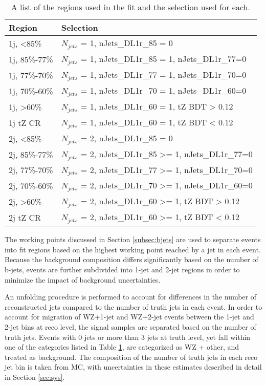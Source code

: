 \begin{table}[H] 
\centering
\caption{A list of the regions used in the fit and the selection used for each.}
\begin{tabular}{l|l}
\hline\hline
Region & Selection            \\
\hline
\hline
1j, <85\%       & $N_{jets}$ = 1, nJets\_DL1r\_85 = 0            \\
1j, 85\%-77\%   & $N_{jets}$ = 1, nJets\_DL1r\_85 = 1, nJets\_DL1r\_77=0                     \\
1j, 77\%-70\%   & $N_{jets}$ = 1, nJets\_DL1r\_77 = 1, nJets\_DL1r\_70=0                     \\
1j, 70\%-60\%   & $N_{jets}$ = 1, nJets\_DL1r\_70 = 1, nJets\_DL1r\_60=0                      \\
1j, >60\%       & $N_{jets}$ = 1, nJets\_DL1r\_60 = 1, tZ BDT > 0.12 \\
1j tZ CR        & $N_{jets}$ = 1, nJets\_DL1r\_60 = 1, tZ BDT < 0.12 \\
2j, <85\%       & $N_{jets}$ = 2, nJets\_DL1r\_85 = 0                    \\
2j, 85\%-77\%   & $N_{jets}$ = 2, nJets\_DL1r\_85 >= 1, nJets\_DL1r\_77=0                     \\
2j, 77\%-70\%   & $N_{jets}$ = 2, nJets\_DL1r\_77 >= 1, nJets\_DL1r\_70=0                     \\
2j, 70\%-60\%   & $N_{jets}$ = 2, nJets\_DL1r\_70 >= 1, nJets\_DL1r\_60=0                      \\
2j, >60\%       & $N_{jets}$ = 2, nJets\_DL1r\_60 >= 1, tZ BDT > 0.12 \\
2j tZ CR        & $N_{jets}$ = 2, nJets\_DL1r\_60 >= 1, tZ BDT < 0.12 \\
\hline\hline
\end{tabular}
\label{tab:regions}
\end{table}

The working points discussed in Section \ref{subsec:bjets} are used to separate events into fit regions based on the highest working point reached by a jet in each event. Because the background composition differs significantly based on the number of b-jets, events are further subdivided into 1-jet and 2-jet regions in order to minimize the impact of background uncertainties.

An unfolding procedure is performed to account for differences in the number of reconstructed jets compared to the number of truth jets in each event. In order to account for migration of WZ+1-jet and WZ+2-jet events between the 1-jet and 2-jet bins at reco level, the signal samples are separated based on the number of truth jets. Events with 0 jets or more than 3 jets at truth level, yet fall within one of the categories listed in Table \ref{tab:regions}, are categorized as WZ + other, and treated as background. The composition of the number of truth jets in each reco jet bin is taken from MC, with uncertainties in these estimates described in detail in Section \ref{sec:sys}. 

